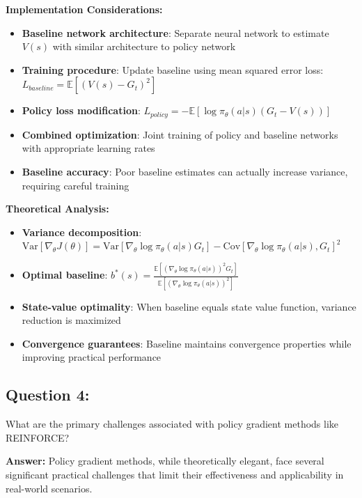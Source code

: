 \documentclass[12pt]{article}
\begin{document}
{{{\textbf{Implementation Considerations:}
\begin{itemize}
    \item \textbf{Baseline network architecture}: Separate neural network to estimate $V(s)$ with similar architecture to policy network
    \item \textbf{Training procedure}: Update baseline using mean squared error loss: $L_{baseline} = \mathbb{E}[(V(s) - G_t)^2]$
    \item \textbf{Policy loss modification}: $L_{policy} = -\mathbb{E}[\log \pi_\theta(a|s) (G_t - V(s))]$
    \item \textbf{Combined optimization}: Joint training of policy and baseline networks with appropriate learning rates
    \item \textbf{Baseline accuracy}: Poor baseline estimates can actually increase variance, requiring careful training
\end{itemize}

\textbf{Theoretical Analysis:}
\begin{itemize}
    \item \textbf{Variance decomposition}: $\text{Var}[\nabla_\theta J(\theta)] = \text{Var}[\nabla_\theta \log \pi_\theta(a|s) G_t] - \text{Cov}[\nabla_\theta \log \pi_\theta(a|s), G_t]^2$
    \item \textbf{Optimal baseline}: $b^*(s) = \frac{\mathbb{E}[(\nabla_\theta \log \pi_\theta(a|s))^2 G_t]}{\mathbb{E}[(\nabla_\theta \log \pi_\theta(a|s))^2]}$
    \item \textbf{State-value optimality}: When baseline equals state value function, variance reduction is maximized
    \item \textbf{Convergence guarantees}: Baseline maintains convergence properties while improving practical performance
\end{itemize}

\subsection{Question 4:}

What are the primary challenges associated with policy gradient methods like REINFORCE?
\vspace*{0.3cm}

\textbf{Answer:} Policy gradient methods, while theoretically elegant, face several significant practical challenges that limit their effectiveness and applicability in real-world scenarios.

}}}
\end{document}
